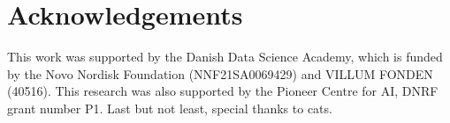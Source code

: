 \documentclass[10pt,twocolumn,letterpaper]{article}
\begin{document}
\section{Acknowledgements}

This work was supported by the Danish Data Science Academy, which is funded by the Novo Nordisk Foundation (NNF21SA0069429) and VILLUM FONDEN (40516). This research was also supported by the Pioneer Centre for AI, DNRF grant number P1. Last but not least, special thanks to cats.

{\small


}
\end{document}
